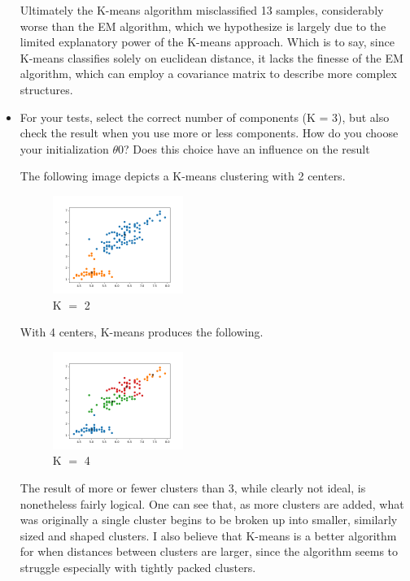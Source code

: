\documentclass[a4paper]{article}
\begin{document}
\begin{itemize}
	Ultimately the K-means algorithm misclassified 13 samples, considerably worse than the EM algorithm, which we hypothesize is largely due to the limited explanatory power of the K-means approach.  Which is to say, since K-means classifies solely on euclidean distance, it lacks the finesse of the EM algorithm, which can employ a covariance matrix to describe more complex structures.

	\clearpage
	\item For your tests, select the correct number of components (K = 3), but also check the result when you use more or less components. How do you choose your initialization $\theta$0? Does this choice have an inﬂuence on the result

	The following image depicts a K-means clustering with 2 centers.
	\begin{figure}[h]
		\begin{center}
			\includegraphics[width=0.4\textwidth]{kmeans_2centers.png}
			\caption{K $=$ 2}
		\end{center}
	\end{figure}

	With 4 centers, K-means produces the following.
	\begin{figure}[h]
		\begin{center}
			\includegraphics[width=0.4\textwidth]{kmeans_4centers.png}
			\caption{K $=$ 4}
		\end{center}
	\end{figure}

	The result of more or fewer clusters than 3, while clearly not ideal, is nonetheless fairly logical.  One can see that, as more clusters are added, what was originally a single cluster begins to be broken up into smaller, similarly sized and shaped clusters.  I also believe that K-means is a better algorithm for when distances between clusters are larger, since the algorithm seems to struggle especially with tightly packed clusters.


\end{itemize}
\end{document}
